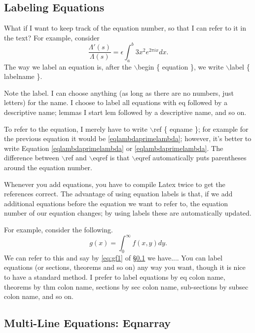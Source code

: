 \documentclass[12pt,reqno]{amsart}
\numberwithin{equation}{section}
\begin{document}
\subsection{Labeling Equations}\label{sec:labellingeqs}

What if I want to keep track of the equation number, so that I can
refer to it in the text? For example, consider
\begin{equation}\label{eqlambdaprimelambda}
\frac{\Lambda'(s)}{\Lambda(s)} = \epsilon \int_a^b 3x^2 e^{2\pi i
x} dx.
\end{equation} The way we label an equation is, after the
$\backslash$begin \{ equation \}, we
write $\backslash$label \{ labelname \}.

Note the label. I can choose anything (as long as there are no
numbers, just letters) for the name. I choose to label all
equations with eq followed by a descriptive name; lemmas I start
lem followed by a descriptive name, and so on.

To refer to the equation, I merely have to write $\backslash$ref
\{ eqname \}; for example for the previous equation it would be
\ref{eqlambdaprimelambda}; however, it's better to write Equation
\ref{eqlambdaprimelambda} or \eqref{eqlambdaprimelambda}. The
difference between $\backslash$ref and $\backslash$eqref is that
$\backslash$eqref automatically puts parentheses around the
equation number.

Whenever you add equations, you have to compile Latex twice to get
the references correct. The advantage of using equation labels is
that, if we add additional equations before the equation we want
to refer to, the equation number of our equation changes; by using
labels these are automatically updated.

For example, consider the following.
\begin{equation}\label{eq:gf1}
g(x) = \int_0^\infty f(x,y) dy.
\end{equation} We can refer to this and say by \eqref{eq:gf1} of
\S\ref{sec:labellingeqs} we have.... You can label equations (or
sections, theorems and so on) any way you want, though it is nice
to have a standard method. I prefer to label equations by eq colon
name, theorems by thm colon name, sections by sec colon name,
sub-sections by subsec colon name, and so on.


\subsection{Multi-Line Equations: Eqnarray}
\end{document}
